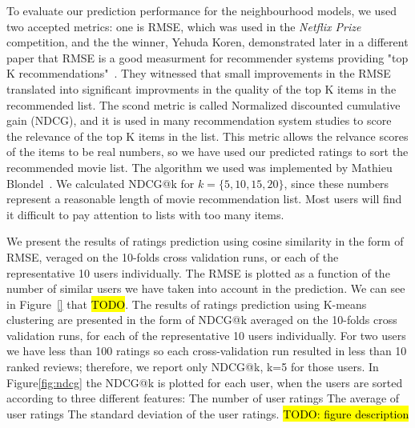 To evaluate our prediction performance for the neighbourhood models, we used two accepted metrics: one is RMSE, which was used in the \textit{Netflix Prize} competition, and the the winner, Yehuda Koren, demonstrated later in a different paper that RMSE is a good measurment for recommender systems providing "top K recommendations"~\cite{koren2008factorization}. They witnessed that small improvements in the RMSE translated into significant improvments in the quality of the top K items in the recommended list. The scond metric is called Normalized discounted cumulative gain (NDCG), and it is used in many recommendation system studies to score the relevance of the top K items in the list. This metric allows the relvance scores of the items to be real numbers, so we have used our predicted ratings to sort the recommended movie list. The algorithm we used was implemented by Mathieu Blondel~\cite{letorMetrics}. We calculated NDCG@k for $k=\{5, 10, 15, 20\}$, since these numbers represent a reasonable length of movie recommendation list. Most users will find it difficult to pay attention to lists with too many items. 

We present the results of ratings prediction using cosine similarity in the form of RMSE, veraged on the 10-folds cross validation runs, or each of the representative 10 users individually. The RMSE is plotted as a function of  the number of similar users we have taken into account in the prediction. We can see in Figure~\ref{} that \hl{TODO}.
The results of ratings prediction using K-means clustering are presented in the form of NDCG@k averaged on the 10-folds cross validation runs, for each of the representative 10 users individually. For two users we have less than 100 ratings so each cross-validation run resulted in less than 10 ranked reviews; therefore, we report only NDCG@k, k=5 for those users. In Figure\ref{fig:ndcg} the NDCG@k is plotted for each user, when the users are sorted according to three different features: \blackone The number of user ratings \blacktwo The average of user ratings \blackthree The standard deviation of the user ratings. \hl{TODO: figure description}